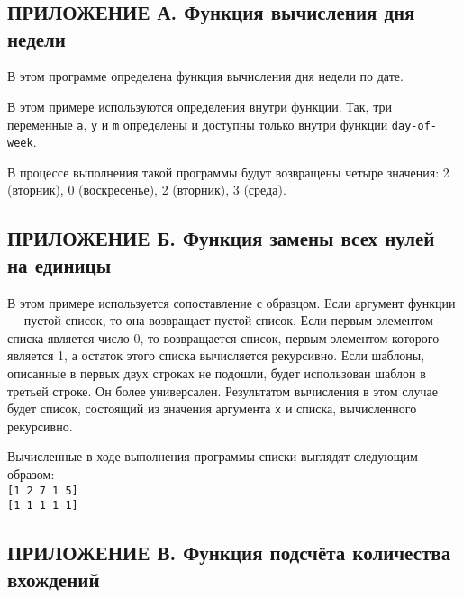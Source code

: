 \section*{\hfill}
    \subsection*{ПРИЛОЖЕНИЕ А. Функция вычисления дня недели}
    
    В этом программе определена функция вычисления дня недели по дате.

    В этом примере используются определения внутри функции.
    Так, три переменные \verb,a,, \verb,y, и \verb,m, определены и доступны только внутри функции \verb,day-of-week,.

    В процессе выполнения такой программы будут возвращены четыре значения: 2 (вторник), 0 (воскресенье), 2 (вторник), 3 (среда).

    \subsection*{ПРИЛОЖЕНИЕ Б. Функция замены всех нулей на единицы}
    

    В этом примере используется сопоставление с образцом.
    Если аргумент функции --- пустой список, то она возвращает пустой список.
    Если первым элементом списка является число 0, то возвращается список, первым элементом которого является 1, а остаток этого списка вычисляется рекурсивно.
    Если шаблоны, описанные в первых двух строках не подошли, будет использован шаблон в третьей строке.
    Он более универсален.
    Результатом вычисления в этом случае будет список, состоящий из значения аргумента \verb,x, и списка, вычисленного рекурсивно.

    Вычисленные в ходе выполнения программы списки выглядят следующим образом:
    \\\verb,[1 2 7 1 5],
    \\\verb,[1 1 1 1 1],

    \subsection*{ПРИЛОЖЕНИЕ В. Функция подсчёта количества вхождений}
    

